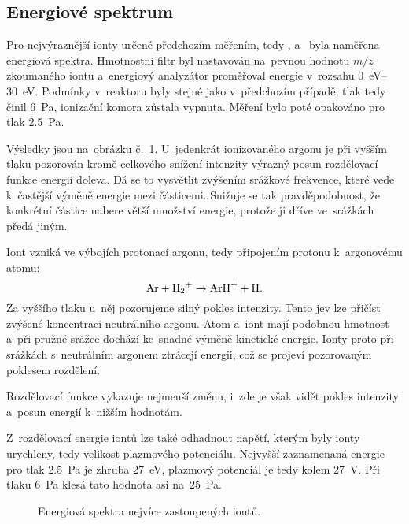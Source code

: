 \documentclass{protokol}
\newcommand\mz{m/z}
\begin{document}
\subsection{Energiové spektrum}
\label{sec:energy}
Pro nejvýraznější ionty určené předchozím měřením,
tedy ,  a~ byla naměřena energiová spektra.
Hmotnostní filtr byl nastavován na~pevnou hodnotu $\mz$ zkoumaného iontu
a~energiový analyzátor proměřoval energie v~rozsahu
\SIrange{0}{30}{\electronvolt}.
Podmínky v~reaktoru byly stejné jako v~předchozím případě,
tlak tedy činil \SI{6}{\pascal}, ionizační komora zůstala vypnuta.
Měření bylo poté opakováno pro tlak \SI{2.5}{\pascal}.

Výsledky jsou na~obrázku č.~\ref{fig:energy}.
U~jedenkrát ionizovaného argonu je při vyšším tlaku pozorován kromě
celkového snížení intenzity výrazný posun rozdělovací funkce energií doleva.
Dá se to vysvětlit zvýšením srážkové frekvence, které vede k~častější
výměně energie mezi částicemi.
Snižuje se tak pravděpodobnost, že konkrétní částice nabere větší
množství energie, protože ji dříve ve~srážkách předá jiným.

Iont  vzniká ve výbojích protonací argonu, tedy připojením
protonu k~argonovému atomu:
\begin{equation}
	\label{eq:arh}
	\ce{Ar} + \ce{H2+} \rightarrow \ce{ArH+} + \ce{H}.
\end{equation}
Za vyššího tlaku u~něj pozorujeme silný pokles intenzity.
Tento jev lze přičíst zvýšené koncentraci neutrálního argonu.
Atom  a~iont  mají podobnou hmotnost a~při pružné srážce
dochází ke~snadné výměně kinetické energie.
Ionty proto při srážkách s~neutrálním argonem ztrácejí energii,
což se projeví pozorovaným poklesem rozdělení.

Rozdělovací funkce  vykazuje nejmenší změnu,
i~zde je však vidět pokles intenzity a~posun energií k~nižším hodnotám.

Z~rozdělovací energie iontů lze také odhadnout napětí, kterým byly ionty
urychleny, tedy velikost plazmového potenciálu.
Nejvyšší zaznamenaná energie pro tlak \SI{2.5}{\pascal} je zhruba
\SI{27}{\electronvolt}, plazmový potenciál je tedy kolem \SI{27}{\volt}.
Při tlaku \SI{6}{\pascal} klesá tato hodnota asi na~\SI{25}{\pascal}.

\begin{figure}[htp]
	\centering
	
	
	\caption{Energiová spektra nejvíce zastoupených iontů.}
	\label{fig:energy}
\end{figure}
\end{document}
